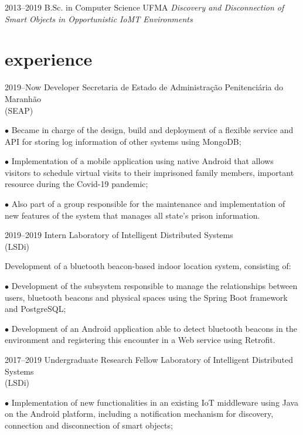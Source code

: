 \documentclass[]{../document-class/twentysecondcv}
\begin{document}
\begin{twenty}
	\twentyitem
		{2013--2019}
		{B.Sc. in Computer Science}
		{UFMA}
		{\emph{Discovery and Disconnection of Smart Objects in Opportunistic IoMT Environments}}
\end{twenty}

\section{experience}

\begin{twenty}
	\twentyitem
		{2019--Now} %
		{Developer} %
		{Secretaria de Estado de Administração Penitenciária do Maranhão \\\hspace*{\fill}(SEAP)}
		{$\bullet$ Became in charge of the design, build and deployment of a flexible service and API for storing log information of other systems using MongoDB;\vskip 4pt
			
		$\bullet$ Implementation of a mobile application using native Android that allows visitors to schedule virtual visits to their imprisoned family members,  important resource during the Covid-19 pandemic;\vskip 4pt


		$\bullet$ Also part of a group responsible for the maintenance and implementation of new features of the system that manages all state's prison information.}
		
	\twentyitem
		{2019--2019} %
		{Intern} %
		{Laboratory of Intelligent Distributed Systems \\\hspace*{\fill}(LSDi)}
		{Development of a bluetooth beacon-based indoor location system, consisting of:\vskip 4pt
          
        
		$\bullet$ Development of the subsystem responsible to manage the relationships between users, bluetooth beacons and physical spaces using the Spring Boot framework and PostgreSQL;\vskip 4pt

		$\bullet$ Development of an Android application able to detect bluetooth beacons in the environment and registering this encounter in a Web service using Retrofit.}

	\twentyitem
		{2017--2019} %
		{Undergraduate Research Fellow} %
		{Laboratory of Intelligent Distributed Systems \\\hspace*{\fill}(LSDi)}
		{$\bullet$ Implementation of new functionalities in an existing IoT middleware using Java on the Android platform, including a notification mechanism for discovery, connection and disconnection of smart objects;\vskip 4pt 


}
\end{twenty}
\end{document}
